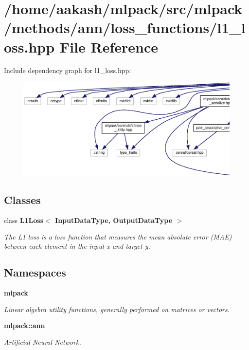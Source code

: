 \section{/home/aakash/mlpack/src/mlpack/methods/ann/loss\+\_\+functions/l1\+\_\+loss.hpp File Reference}
\label{l1__loss_8hpp}
Include dependency graph for l1\+\_\+loss.\+hpp\+:
\nopagebreak
\begin{figure}[H]
\begin{center}
\leavevmode
\includegraphics[width=350pt]{l1__loss_8hpp__incl}
\end{center}
\end{figure}
\subsection*{Classes}
\begin{DoxyCompactItemize}
\item 
class \textbf{ L1\+Loss$<$ Input\+Data\+Type, Output\+Data\+Type $>$}
\begin{DoxyCompactList}\small\item\em The L1 loss is a loss function that measures the mean absolute error (M\+AE) between each element in the input x and target y. \end{DoxyCompactList}\end{DoxyCompactItemize}
\subsection*{Namespaces}
\begin{DoxyCompactItemize}
\item 
 \textbf{ mlpack}
\begin{DoxyCompactList}\small\item\em Linear algebra utility functions, generally performed on matrices or vectors. \end{DoxyCompactList}\item 
 \textbf{ mlpack\+::ann}
\begin{DoxyCompactList}\small\item\em Artificial Neural Network. \end{DoxyCompactList}\end{DoxyCompactItemize}


